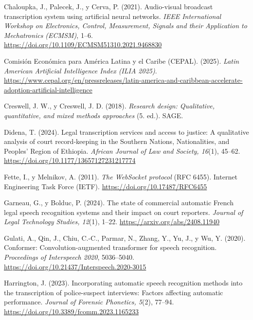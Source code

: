 \documentclass[12pt,a4paper,oneside]{report}
\begin{document}
\vspace{6pt}
Chaloupka, J., Palecek, J., y Cerva, P. (2021). Audio-visual broadcast transcription system using artificial neural networks. \textit{IEEE International Workshop on Electronics, Control, Measurement, Signals and their Application to Mechatronics (ECMSM)}, 1--6. \url{https://doi.org/10.1109/ECMSM51310.2021.9468830}

\vspace{6pt}
Comisión Económica para América Latina y el Caribe (CEPAL). (2025). \textit{Latin American Artificial Intelligence Index (ILIA 2025)}. \url{https://www.cepal.org/en/pressreleases/latin-america-and-caribbean-accelerate-adoption-artificial-intelligence}

\vspace{6pt}
Creswell, J. W., y Creswell, J. D. (2018). \textit{Research design: Qualitative, quantitative, and mixed methods approaches} (5.\textordfeminine{} ed.). SAGE.

\vspace{6pt}
Didena, T. (2024). Legal transcription services and access to justice: A qualitative analysis of court record-keeping in the Southern Nations, Nationalities, and Peoples' Region of Ethiopia. \textit{African Journal of Law and Society, 16}(1), 45--62. \url{https://doi.org/10.1177/13657127231217774}

\vspace{6pt}
Fette, I., y Melnikov, A. (2011). \textit{The WebSocket protocol} (RFC 6455). Internet Engineering Task Force (IETF). \url{https://doi.org/10.17487/RFC6455}

\vspace{6pt}
Garneau, G., y Bolduc, P. (2024). The state of commercial automatic French legal speech recognition systems and their impact on court reporters. \textit{Journal of Legal Technology Studies, 12}(1), 1--22. \url{https://arxiv.org/abs/2408.11940}

\vspace{6pt}
Gulati, A., Qin, J., Chiu, C.-C., Parmar, N., Zhang, Y., Yu, J., y Wu, Y. (2020). Conformer: Convolution-augmented transformer for speech recognition. \textit{Proceedings of Interspeech 2020}, 5036--5040. \url{https://doi.org/10.21437/Interspeech.2020-3015}

\vspace{6pt}
Harrington, J. (2023). Incorporating automatic speech recognition methods into the transcription of police-suspect interviews: Factors affecting automatic performance. \textit{Journal of Forensic Phonetics, 5}(2), 77--94. \url{https://doi.org/10.3389/fcomm.2023.1165233}
\end{document}
